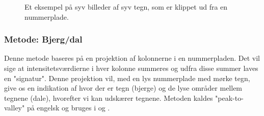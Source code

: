 \begin{figure}[htp]
  \centering
  \begin{minipage}[c]{8 cm}
	\end{minipage}
  \caption{Et eksempel på syv billeder af syv tegn, som er klippet ud fra en nummerplade.}
  \label{fig:tegn-udklip}
\end{figure}

\subsubsection*{Metode: Bjerg/dal}
Denne metode baseres på en projektion af kolonnerne i en nummerpladen. Det vil sige at intensitetsværdierne i hver kolonne summeres og udfra disse summer laves en "signatur". Denne projektion vil, med en lys nummerplade med mørke tegn, give os en indikation af hvor der er tegn (bjerge) og de lyse områder mellem tegnene (dale), hvorefter vi kan udskærer tegnene. Metoden kaldes "peak-to-valley" på engelsk og bruges i \cite{ron} og \cite{kwas}.


